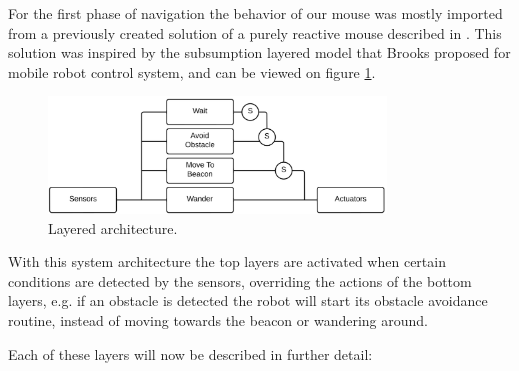 \documentclass[oribibl]{llncs}
\begin{document}
For the first phase of navigation the behavior of our mouse was mostly imported from a previously created solution of a purely reactive mouse described in \cite{Moreira2012}. This solution was inspired by the subsumption layered model that Brooks proposed for mobile robot control system\cite{Brooks_1986}, and can be viewed on figure \ref{fig:layered}.

\begin{figure}
  \centering
  \includegraphics[width=0.8\textwidth]{layer-architecture.png}
  \caption{Layered architecture.}
  \label{fig:layered}
\end{figure}

With this system architecture the top layers are activated when certain conditions are detected by the sensors, overriding the actions of the bottom layers, e.g. if an obstacle is detected the robot will start its obstacle avoidance routine, instead of moving towards the beacon or wandering around. 

Each of these layers will now be described in further detail:
\end{document}
